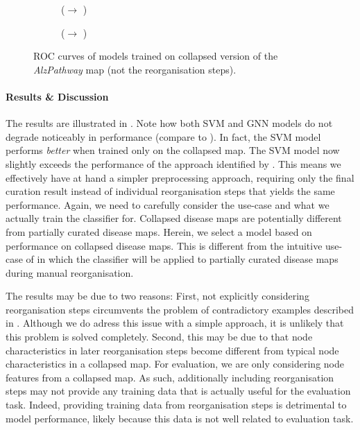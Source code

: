 \documentclass[
	fontsize=10pt, %
	twoside=true, %
	secnumdepth=1, %
  toc=indentunnumbered %
]{kaobook}
\begin{document}
\begin{figure}[h]
  \centering
  \begin{subfigure}[h]{0.48\linewidth}
    \caption{(\ADLast $\rightarrow$ \PDMap)}
  \end{subfigure}
  \begin{subfigure}[h]{0.48\linewidth}
    \caption{(\ADLast $\rightarrow$ \ReconMap{})}
  \end{subfigure}
  \caption{ROC curves of models trained on collapsed version of the
    \textit{AlzPathway} map (not the reorganisation steps).}
  \label{fig:importance-reorganisation-steps}
\end{figure}

\paragraph{Results \& Discussion} The results are illustrated in
. Note how both SVM and GNN models do
not degrade noticeably in performance (compare to ).
In fact, the SVM model performs \textit{better} when trained only on the
collapsed map. The SVM model now slightly exceeds the performance of the
approach identified by \nielsen{}. This means we effectively have at hand a
simpler preprocessing approach, requiring only the final curation result instead
of individual reorganisation steps that yields the same performance. Again, we
need to carefully consider the use-case and what we actually train the
classifier for. Collapsed disease maps are potentially different from partially
curated disease maps. Herein, we select a model based on performance on
collapsed disease maps. This is different from the intuitive use-case of
\nielsen{} in which the classifier will be applied to partially curated disease
maps during manual reorganisation.

The results may be due to two reasons: First, not
explicitly considering reorganisation steps circumvents the problem of
contradictory examples described in . Although we do adress
this issue with a simple approach, it is unlikely that this problem is solved
completely. Second, this may be due to that node characteristics in later
reorganisation steps become different from typical node characteristics in a
collapsed map. For evaluation, we are only considering node features from a
collapsed map. As such, additionally including reorganisation steps may not
provide any training data that is actually useful for the evaluation task.
Indeed, providing training data from reorganisation steps is detrimental to
model performance, likely because this data is not well related to evaluation
task.
\end{document}
